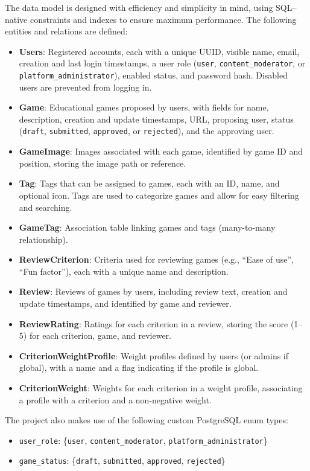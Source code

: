 \documentclass[11pt,italian,a4paper]{article}
\begin{document}
The data model is designed with efficiency and simplicity in mind, using SQL--native constraints and indexes to ensure maximum performance. The following entities and relations are defined:

\begin{itemize}
    \item \textbf{Users}: Registered accounts, each with a unique UUID, visible name, email, creation and last login timestamps, a user role (\texttt{user}, \texttt{content\_moderator}, or \texttt{platform\_administrator}), enabled status, and password hash. Disabled users are prevented from logging in.
    \item \textbf{Game}: Educational games proposed by users, with fields for name, description, creation and update timestamps, URL, proposing user, status (\texttt{draft}, \texttt{submitted}, \texttt{approved}, or \texttt{rejected}), and the approving user.
    \item \textbf{GameImage}: Images associated with each game, identified by game ID and position, storing the image path or reference.
    \item \textbf{Tag}: Tags that can be assigned to games, each with an ID, name, and optional icon. Tags are used to categorize games and allow for easy filtering and searching.
    \item \textbf{GameTag}: Association table linking games and tags (many-to-many relationship).
    \item \textbf{ReviewCriterion}: Criteria used for reviewing games (e.g., ``Ease of use'', ``Fun factor''), each with a unique name and description.
    \item \textbf{Review}: Reviews of games by users, including review text, creation and update timestamps, and identified by game and reviewer.
    \item \textbf{ReviewRating}: Ratings for each criterion in a review, storing the score (1--5) for each criterion, game, and reviewer.
    \item \textbf{CriterionWeightProfile}: Weight profiles defined by users (or admins if global), with a name and a flag indicating if the profile is global.
    \item \textbf{CriterionWeight}: Weights for each criterion in a weight profile, associating a profile with a criterion and a non-negative weight.
\end{itemize}

\noindent The project also makes use of the following custom PostgreSQL enum types:
\begin{itemize}
    \item \texttt{user\_role}: \{\texttt{user}, \texttt{content\_moderator}, \texttt{platform\_administrator}\}
    \item \texttt{game\_status}: \{\texttt{draft}, \texttt{submitted}, \texttt{approved}, \texttt{rejected}\}
\end{itemize}
\end{document}
